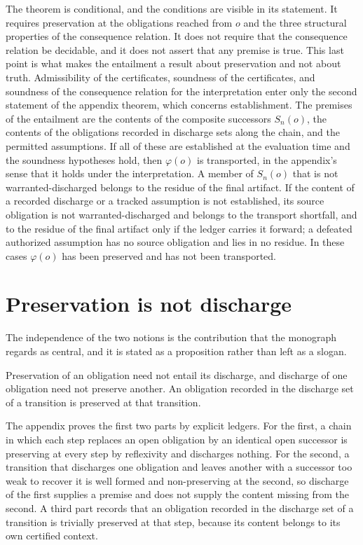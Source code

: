 The theorem is conditional, and the conditions are visible in its statement. It requires preservation at the obligations reached from $o$ and the three structural properties of the consequence relation. It does not require that the consequence relation be decidable, and it does not assert that any premise is true. This last point is what makes the entailment a result about preservation and not about truth. Admissibility of the certificates, soundness of the certificates, and soundness of the consequence relation for the interpretation enter only the second statement of the appendix theorem, which concerns establishment. The premises of the entailment are the contents of the composite successors $S_n(o)$, the contents of the obligations recorded in discharge sets along the chain, and the permitted assumptions. If all of these are established at the evaluation time and the soundness hypotheses hold, then $\varphi(o)$ is transported, in the appendix's sense that it holds under the interpretation. A member of $S_n(o)$ that is not warranted-discharged belongs to the residue of the final artifact. If the content of a recorded discharge or a tracked assumption is not established, its source obligation is not warranted-discharged and belongs to the transport shortfall, and to the residue of the final artifact only if the ledger carries it forward; a defeated authorized assumption has no source obligation and lies in no residue. In these cases $\varphi(o)$ has been preserved and has not been transported.

\section{Preservation is not discharge}

The independence of the two notions is the contribution that the monograph regards as central, and it is stated as a proposition rather than left as a slogan.

\begin{proposition}[RV-018]
\label{prop:rv018-ch}
Preservation of an obligation need not entail its discharge, and discharge of one obligation need not preserve another. An obligation recorded in the discharge set of a transition is preserved at that transition.
\end{proposition}

The appendix proves the first two parts by explicit ledgers. For the first, a chain in which each step replaces an open obligation by an identical open successor is preserving at every step by reflexivity and discharges nothing. For the second, a transition that discharges one obligation and leaves another with a successor too weak to recover it is well formed and non-preserving at the second, so discharge of the first supplies a premise and does not supply the content missing from the second. A third part records that an obligation recorded in the discharge set of a transition is trivially preserved at that step, because its content belongs to its own certified context.

